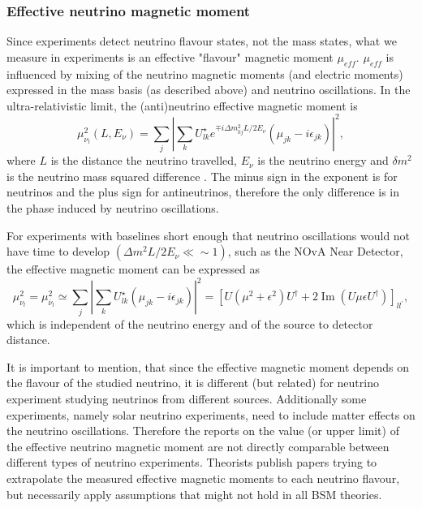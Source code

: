 \subsubsection{Effective neutrino magnetic moment}
Since experiments detect neutrino flavour states, not the mass states, what we measure in experiments is an effective "flavour" magnetic moment $\mu_{eff}$. $\mu_{eff}$ is influenced by mixing of the neutrino magnetic moments (and electric moments) expressed in the mass basis (as described above) and neutrino oscillations. In the ultra-relativistic limit, the (anti)neutrino effective magnetic moment is
\begin{equation}
\mu_{\nu_l}^2\left(L,E_{\nu}\right)=\sum_j\left|\sum_k U^{\star}_{lk}e^{\mp i\Delta m^2_{kj}L/2E_{\nu}}\left(\mu_{jk}-i\epsilon_{jk}\right)\right|^2,
\end{equation}
where $L$ is the distance the neutrino travelled, $E_\nu$ is the neutrino energy and $\delta m^2$ is the neutrino mass squared difference \cite{nuElmagInt2015.pdf}. The minus sign in the exponent is for neutrinos and the plus sign for antineutrinos, therefore the only difference is in the phase induced by neutrino oscillations.

For experiments with baselines short enough that neutrino oscillations would not have time to develop $\left(\Delta m^2L/2E_{\nu}\ll\sim1\right)$, such as the NOvA Near Detector, the effective magnetic moment can be expressed as
\begin{equation}
\mu_{\nu_l}^2=\mu_{\overline{\nu}_l}^2\simeq\sum_j\left|\sum_k U_{lk}^{\star}\left(\mu_{jk}-i\epsilon_{jk}\right)\right|^2=\left[U\left(\mu^2+\epsilon^2\right)U^{\dagger}+2\operatorname{Im}\left(U\mu\epsilon U^{\dagger}\right)\right]_{ll^{\prime}},
\end{equation}
which is independent of the neutrino energy and of the source to detector distance.

It is important to mention, that since the effective magnetic moment depends on the flavour of the studied neutrino, it is different (but related) for neutrino experiment studying neutrinos from different sources. Additionally some experiments, namely solar neutrino experiments, need to include matter effects on the neutrino oscillations. Therefore the reports on the value (or upper limit) of the effective neutrino magnetic moment are not directly comparable between different types of neutrino experiments. Theorists publish papers trying to extrapolate the measured effective magnetic moments to each neutrino flavour, but necessarily apply assumptions that might not hold in all BSM theories.

